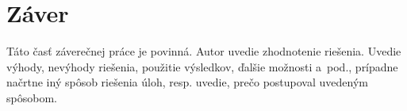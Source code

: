 \section{Z\'aver}

Táto časť\/ záverečnej práce je povinná. Autor uvedie zhodnotenie
riešenia. Uvedie výhody, nevýhody riešenia,  použitie výsledkov, ďalšie
možnosti a~pod., prípadne načrtne iný spôsob riešenia úloh, resp.
uvedie, prečo postupoval uvedeným spôsobom.
